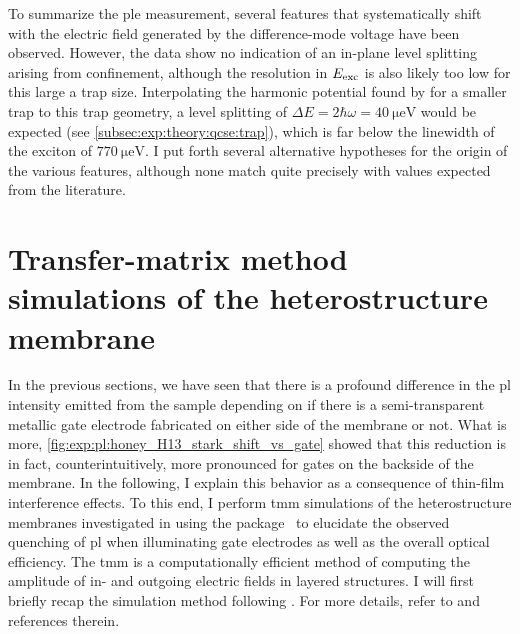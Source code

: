 To summarize the \gls{ple} measurement, several features that systematically shift with the electric field generated by the difference-mode voltage \VDM have been observed.
However, the data show no indication of an in-plane level splitting arising from confinement, although the resolution in $E_{\mathrm{exc}}$ is also likely too low for this large a trap size.
Interpolating the harmonic potential found by \citet{Descamps2021} for a smaller trap to this trap geometry,
a level splitting of $\Delta E = 2\hbar\omega = \qty{40}{\micro\electronvolt}$ would be expected (see \cref{subsec:exp:theory:qcse:trap}), which is far below the linewidth of the exciton of $\qty{770}{\micro\electronvolt}$.
I put forth several alternative hypotheses for the origin of the various features, although none match quite precisely with values expected from the literature.

\section{Transfer-matrix method simulations of the heterostructure membrane}\label{sec:exp:tmm}
In the previous sections, we have seen that there is a profound difference in the \gls{pl} intensity emitted from the sample depending on if there is a semi-transparent metallic gate electrode fabricated on either side of the membrane or not.
What is more, \cref{fig:exp:pl:honey_H13_stark_shift_vs_gate} showed that this reduction is in fact, counterintuitively, more pronounced for gates on the backside of the membrane.
In the following, I explain this behavior as a consequence of thin-film interference effects.
To this end, I perform \gls{tmm} simulations of the heterostructure membranes investigated in \thispart using the \pymoosh package~\cite{Langevin2024} to elucidate the observed quenching of \gls{pl} when illuminating gate electrodes as well as the overall optical efficiency.
The \gls{tmm} is a computationally efficient method of computing the amplitude of in- and outgoing electric fields in layered structures.
I will first briefly recap the simulation method following .
For more details, refer to \ibid and references therein.

